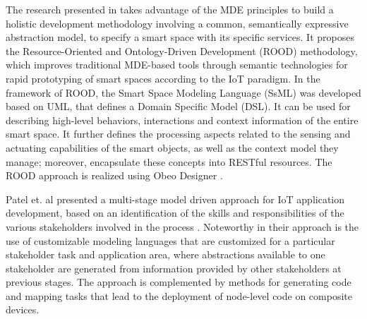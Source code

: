 The research presented in \cite{Corredor+2012} takes advantage of the MDE principles to build a holistic development methodology involving a common, semantically expressive abstraction model, to specify a smart space with its specific services. It proposes the Resource-Oriented and Ontology-Driven Development (ROOD) methodology, which improves traditional MDE-based tools through semantic technologies for rapid prototyping of smart spaces according to the IoT paradigm. In the framework of ROOD, the Smart Space Modeling Language (SsML) was developed based on UML, that defines a Domain Specific Model (DSL). It can be used for describing high-level behaviors, interactions and context information of the entire smart space. It further defines the processing aspects related to the sensing and actuating capabilities of the smart objects, as well as the context model they manage; moreover, encapsulate these concepts into RESTful resources. The ROOD approach is realized using Obeo Designer \cite{Designer2016}.

Patel et. al presented a multi-stage model driven approach for IoT application development, based on an identification of the skills and responsibilities of the various stakeholders involved in the process \cite{patel2015enabling}.  Noteworthy in their approach is the use of customizable modeling languages that are customized for a particular stakeholder task and application area, where abstractions available to one stakeholder are generated from information provided by other stakeholders at previous stages. The approach is complemented by methods for generating code and mapping tasks that lead to the deployment of node-level code on composite devices.